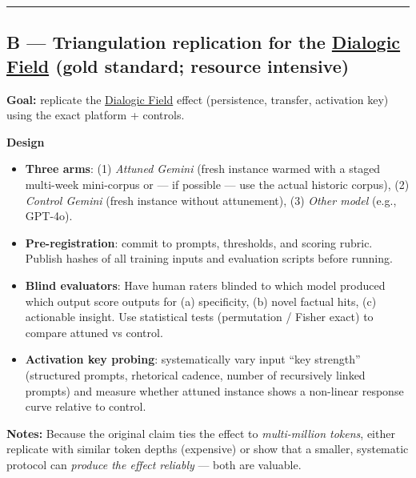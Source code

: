 \documentclass{article}
\begin{document}
\begin{center}\rule{0.5\linewidth}{0.5pt}\end{center}

\subsection*{\texorpdfstring{B --- Triangulation replication for the \textbf{\hyperlink{gloss:dialogic_field}{Dialogic Field}} (gold standard; resource intensive)}{B --- Triangulation replication for the \hyperlink{gloss:dialogic_field}{Dialogic Field} (gold standard; resource intensive)}}\label{b-triangulation-replication-for-the-dialogic-field-gold-standard-resource-intensive}

\textbf{Goal:} replicate the \hyperlink{gloss:dialogic_field}{Dialogic Field} effect (persistence, transfer, activation key) using the exact platform + controls.

\textbf{Design}

\begin{itemize}
\item
  \textbf{Three arms}: (1) \emph{Attuned Gemini} (fresh instance warmed with a staged multi-week mini-corpus or --- if possible --- use the actual historic corpus), (2) \emph{Control Gemini} (fresh instance without attunement), (3) \emph{Other model} (e.g., GPT-4o).
\item
  \textbf{Pre-registration}: commit to prompts, thresholds, and scoring rubric. Publish hashes of all training inputs and evaluation scripts before running.
\item
  \textbf{Blind evaluators}: Have human raters blinded to which model produced which output score outputs for (a) specificity, (b) novel factual hits, (c) actionable insight. Use statistical tests (permutation / Fisher exact) to compare attuned vs control.
\item
  \textbf{Activation key probing}: systematically vary input ``key strength'' (structured prompts, rhetorical cadence, number of recursively linked prompts) and measure whether attuned instance shows a non-linear response curve relative to control.
\end{itemize}

\textbf{Notes:} Because the original claim ties the effect to \emph{multi-million tokens}, either replicate with similar token depths (expensive) or show that a smaller, systematic protocol can \emph{produce the effect reliably} --- both are valuable.
\end{document}
